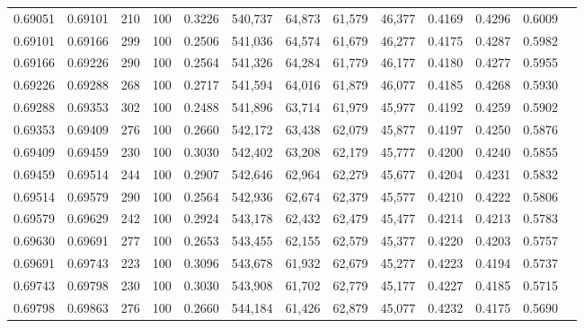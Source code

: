 \begin{tabular}{rrrrrrrrrrrrr}
0.69051 & 0.69101 &   210 & 100 &                                     0.3226 & 540,737 &  64,873 &  61,579 &  46,377 & 0.4169 & 0.4296 & 0.6009 \\
0.69101 & 0.69166 &   299 & 100 &                                     0.2506 & 541,036 &  64,574 &  61,679 &  46,277 & 0.4175 & 0.4287 & 0.5982 \\
0.69166 & 0.69226 &   290 & 100 &                                     0.2564 & 541,326 &  64,284 &  61,779 &  46,177 & 0.4180 & 0.4277 & 0.5955 \\
0.69226 & 0.69288 &   268 & 100 &                                     0.2717 & 541,594 &  64,016 &  61,879 &  46,077 & 0.4185 & 0.4268 & 0.5930 \\
0.69288 & 0.69353 &   302 & 100 &                                     0.2488 & 541,896 &  63,714 &  61,979 &  45,977 & 0.4192 & 0.4259 & 0.5902 \\
0.69353 & 0.69409 &   276 & 100 &                                     0.2660 & 542,172 &  63,438 &  62,079 &  45,877 & 0.4197 & 0.4250 & 0.5876 \\
0.69409 & 0.69459 &   230 & 100 &                                     0.3030 & 542,402 &  63,208 &  62,179 &  45,777 & 0.4200 & 0.4240 & 0.5855 \\
0.69459 & 0.69514 &   244 & 100 &                                     0.2907 & 542,646 &  62,964 &  62,279 &  45,677 & 0.4204 & 0.4231 & 0.5832 \\
0.69514 & 0.69579 &   290 & 100 &                                     0.2564 & 542,936 &  62,674 &  62,379 &  45,577 & 0.4210 & 0.4222 & 0.5806 \\
0.69579 & 0.69629 &   242 & 100 &                                     0.2924 & 543,178 &  62,432 &  62,479 &  45,477 & 0.4214 & 0.4213 & 0.5783 \\
0.69630 & 0.69691 &   277 & 100 &                                     0.2653 & 543,455 &  62,155 &  62,579 &  45,377 & 0.4220 & 0.4203 & 0.5757 \\
0.69691 & 0.69743 &   223 & 100 &                                     0.3096 & 543,678 &  61,932 &  62,679 &  45,277 & 0.4223 & 0.4194 & 0.5737 \\
0.69743 & 0.69798 &   230 & 100 &                                     0.3030 & 543,908 &  61,702 &  62,779 &  45,177 & 0.4227 & 0.4185 & 0.5715 \\
0.69798 & 0.69863 &   276 & 100 &                                     0.2660 & 544,184 &  61,426 &  62,879 &  45,077 & 0.4232 & 0.4175 & 0.5690 \\

\end{tabular}
